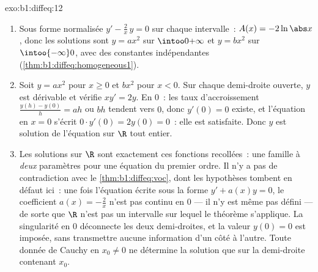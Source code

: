\begin{solution}{exo:b1:diffeq:12}
\begin{enumerate}
  \item Sous forme normalisée $y' - \frac2x\,y = 0$ sur chaque
        intervalle~: $A(x) = -2\ln\abs x$, donc les solutions sont $y =
        a x^2$ sur $\intoo0{+\infty}$ et $y = b x^2$ sur
        $\intoo{-\infty}0$, avec des constantes indépendantes
        (\cref{thm:b1:diffeq:homogeneous1}).
  \item Soit $y = ax^2$ pour $x \geq 0$ et $bx^2$ pour $x < 0$. Sur
        chaque demi-droite ouverte, $y$ est dérivable et vérifie $xy'
        = 2y$. En $0$~: les taux d'accroissement $\frac{y(h) -
        y(0)}h = ah$ ou $bh$ tendent vers $0$, donc $y'(0) = 0$
        existe, et l'équation en $x = 0$ s'écrit $0 \cdot y'(0) =
        2y(0) = 0$~: elle est satisfaite. Donc $y$ est solution de
        l'équation sur $\R$ tout entier.
  \item Les solutions sur $\R$ sont exactement ces fonctions
        recollées~: une famille à \emph{deux} paramètres pour une
        équation du premier ordre. Il n'y a pas de contradiction avec
        le \cref{thm:b1:diffeq:voc}, dont les hypothèses tombent en
        défaut ici~: une fois l'équation écrite sous la forme
        $y' + a(x)y = 0$, le coefficient $a(x) = -\frac2x$ n'est pas
        continu en $0$ ---
        il n'y est même pas défini --- de sorte que $\R$ n'est pas un
        intervalle sur lequel le théorème s'applique. La singularité en
        $0$ déconnecte les deux demi-droites, et la valeur $y(0) = 0$
        est imposée, sans transmettre aucune information d'un côté à
        l'autre. Toute donnée de Cauchy en $x_0 \neq 0$ ne détermine la
        solution que sur la demi-droite contenant $x_0$.
\end{enumerate}
\end{solution}

